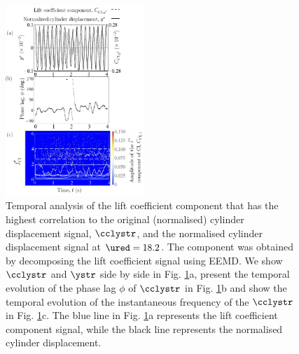 \documentclass[a4paper,fleqn]{cas-sc}
\begin{document}
\begin{figure}
  \centering
  \includegraphics[width=0.47\textwidth]{figs/figure17}
  \caption{Temporal analysis of the lift coefficient component that has the highest correlation to the original (normalised) cylinder displacement signal, $\cclystr$, and the normalised cylinder displacement signal at $\ured = 18.2$. The component was obtained by decomposing the lift coefficient signal using EEMD. We show $\cclystr$ and $\ystr$ side by side in Fig. \ref{fig:tempAnalysisStableInitialBranch}a, present the temporal evolution of the phase lag $\phi$ of $\cclystr$ in Fig. \ref{fig:tempAnalysisStableInitialBranch}b and show the temporal evolution of the instantaneous frequency of the $\cclystr$ in Fig. \ref{fig:tempAnalysisStableInitialBranch}c. The blue line in Fig. \ref{fig:tempAnalysisStableInitialBranch}a represents the lift coefficient component signal, while the black line represents the normalised cylinder displacement.}
  \label{fig:tempAnalysisStableInitialBranch}
\end{figure}
\end{document}

